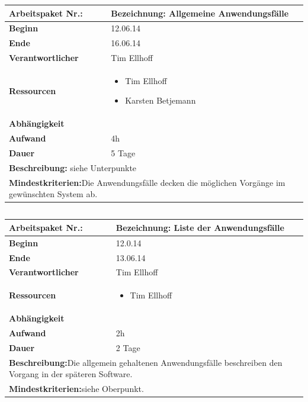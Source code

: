 \documentclass[fontsize=12pt,paper=a4,twoside]{scrartcl}
\begin{document}
	\begin{verbatim} 
	\end{verbatim}
	
	\begin{tabular}{|p{5.3cm}|p{9.7cm}|}\hline
		\textbf{Arbeitspaket Nr.:}  & \textbf{Bezeichnung:} Allgemeine Anwendungsfälle\\ \hline \hline
		\textbf{Beginn} & 12.06.14\\ \hline
		\textbf{Ende} & 16.06.14\\ \hline
		\textbf{Verantwortlicher} & Tim Ellhoff\\ \hline
		\textbf{Ressourcen} & \begin{itemize}
			\item Tim Ellhoff
			\item Karsten Betjemann
		\end{itemize}    \\ \hline
		\textbf{Abhängigkeit} &\\ \hline
		\textbf{Aufwand} & 4h \\ \hline
		\textbf{Dauer} & 5 Tage\\ \hline
		\multicolumn{2}{|p{15cm}|}{\textbf{Beschreibung:} siehe Unterpunkte\newline  }\\ \hline
		\multicolumn{2}{|p{15cm}|}{\textbf{Mindestkriterien:}\newline Die Anwendungsfälle decken die möglichen Vorgänge im gewünschten System ab. }\\ \hline
	\end{tabular}
	
	\begin{verbatim} 
	\end{verbatim}
	
	\begin{tabular}{|p{5.3cm}|p{9.7cm}|}\hline
		\textbf{Arbeitspaket Nr.:}  & \textbf{Bezeichnung:} Liste der Anwendungsfälle\\ \hline \hline
		\textbf{Beginn} & 12.0.14\\ \hline
		\textbf{Ende} & 13.06.14\\ \hline
		\textbf{Verantwortlicher} & Tim Ellhoff\\ \hline
		\textbf{Ressourcen} & \begin{itemize}
			\item Tim Ellhoff 
		\end{itemize}    \\ \hline
		\textbf{Abhängigkeit} &\\ \hline
		\textbf{Aufwand} & 2h\\ \hline
		\textbf{Dauer} & 2 Tage\\ \hline
		\multicolumn{2}{|p{15cm}|}{\textbf{Beschreibung:}\newline Die allgemein gehaltenen Anwendungsfälle beschreiben den Vorgang in der späteren Software.}\\ \hline
		\multicolumn{2}{|p{15cm}|}{\textbf{Mindestkriterien:}\newline siehe Oberpunkt. }\\ \hline
	\end{tabular}
	
\end{document}

